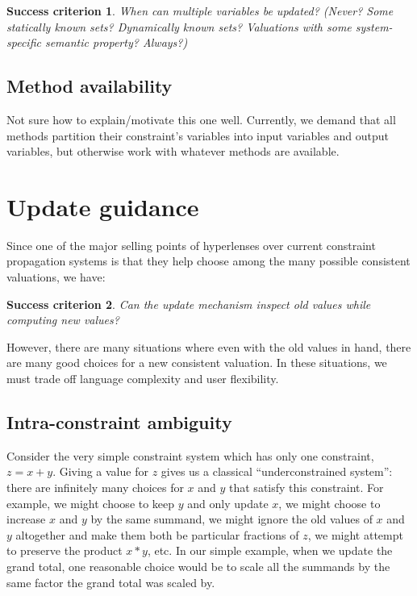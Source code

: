 \documentclass{article}
\newtheorem{success}{Success criterion}
\begin{document}
\begin{success}
When can multiple variables be updated? (Never? Some statically
known sets? Dynamically known sets? Valuations with some system-specific
semantic property? Always?)
\end{success}

\subsection{Method availability}
Not sure how to explain/motivate this one well. Currently, we demand that
all methods partition their constraint's variables into input variables and
output variables, but otherwise work with whatever methods are available.

\section{Update guidance}
Since one of the major selling points of hyperlenses over current constraint
propagation systems is that they help choose among the many possible
consistent valuations, we have:

\begin{success}
Can the update mechanism inspect old values while computing new values?
\end{success}

However, there are many situations where even with the old values in hand,
there are many good choices for a new consistent valuation. In these
situations, we must trade off language complexity and user flexibility.

\subsection{Intra-constraint ambiguity}
Consider the very simple constraint system which has only one constraint, $z
= x+y$. Giving a value for $z$ gives us a classical ``underconstrained
system'': there are infinitely many choices for $x$ and $y$ that satisfy
this constraint. For example, we might choose to keep $y$ and only update
$x$, we might choose to increase $x$ and $y$ by the same summand, we might
ignore the old values of $x$ and $y$ altogether and make them both be
particular fractions of $z$, we might attempt to preserve the product $x*y$,
etc. In our simple example, when we update the grand total, one reasonable
choice would be to scale all the summands by the same factor the grand total
was scaled by.
\end{document}
